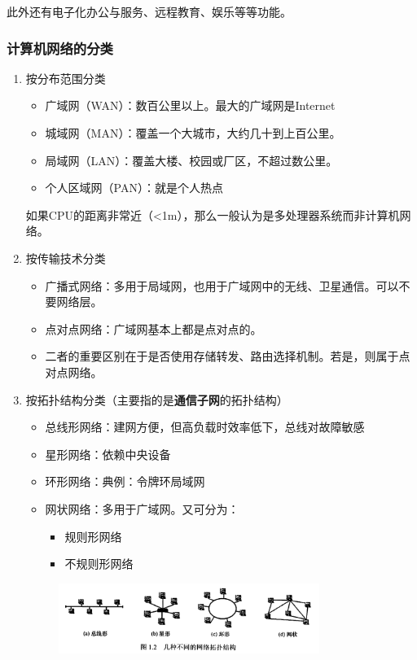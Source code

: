 \documentclass[12pt, a4paper, oneside]{ctexart}
\begin{document}
此外还有电子化办公与服务、远程教育、娱乐等等功能。

\subsubsection{计算机网络的分类}

\begin{enumerate}
    \item 按分布范围分类
    \begin{itemize}
        \item 广域网（WAN）：数百公里以上。最大的广域网是Internet
        \item 城域网（MAN）：覆盖一个大城市，大约几十到上百公里。
        \item 局域网（LAN）：覆盖大楼、校园或厂区，不超过数公里。
        \item 个人区域网（PAN）：就是个人热点
    \end{itemize}
    如果CPU的距离非常近（<1m），那么一般认为是多处理器系统而非计算机网络。
    \item 按传输技术分类
    \begin{itemize}
        \item 广播式网络：多用于局域网，也用于广域网中的无线、卫星通信。可以不要网络层。
        \item 点对点网络：广域网基本上都是点对点的。
        \item 二者的重要区别在于是否使用存储转发、路由选择机制。若是，则属于点对点网络。
    \end{itemize}
    \item 按拓扑结构分类（主要指的是\textbf{通信子网}的拓扑结构）
    \begin{itemize}
        \item 总线形网络：建网方便，但高负载时效率低下，总线对故障敏感
        \item 星形网络：依赖中央设备
        \item 环形网络：典例：令牌环局域网
        \item 网状网络：多用于广域网。又可分为：
        \begin{itemize}
            \item 规则形网络
            \item 不规则形网络
        \end{itemize}
    \end{itemize}
    \begin{figure}
        \centering
        \includegraphics[width=0.8\textwidth]{./images/topo_structures.png}

\end{figure}
\end{enumerate}
\end{document}
